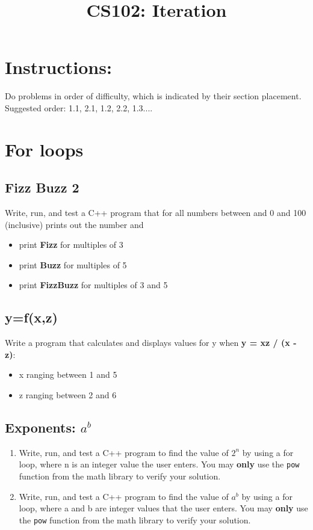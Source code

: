 \documentclass{article}
\begin{document}
\title{CS102: Iteration}

\maketitle
\section*{Instructions:}
Do problems in order of difficulty, which is indicated by their section placement. Suggested order: 1.1, 2.1, 1.2, 2.2, 1.3....
\section{For loops}
\subsection{Fizz Buzz 2}
Write, run, and test a C++ program that for all numbers between and 0 and 100 (inclusive) prints out the number and
\begin{itemize}
	\item print \textbf{Fizz} for multiples of 3
	\item print \textbf{Buzz} for multiples of 5
	\item print \textbf{FizzBuzz} for multiples of 3 and 5
\end{itemize}

\subsection{y=f(x,z)}
Write a program that calculates and displays values for y when \textbf{y = xz / (x - z)}:

\begin{itemize}
 	\item x ranging between 1 and 5
	\item z ranging between 2 and 6
\end{itemize}

\subsection{Exponents: $a^{b}$}
\begin{enumerate}
	\item Write, run, and test a C++ program to find the value of $2^{n}$ by using a for loop, where n is an integer value the user enters. You may \textbf{only} use the \texttt{pow} function from the math library to verify your solution.
	\item Write, run, and test a C++ program to find the value of $a^{b}$  by using a for loop, where a and b are integer values that the user enters. You may \textbf{only} use the \texttt{pow} function from the math library to verify your solution.
\end{enumerate}
\end{document}
